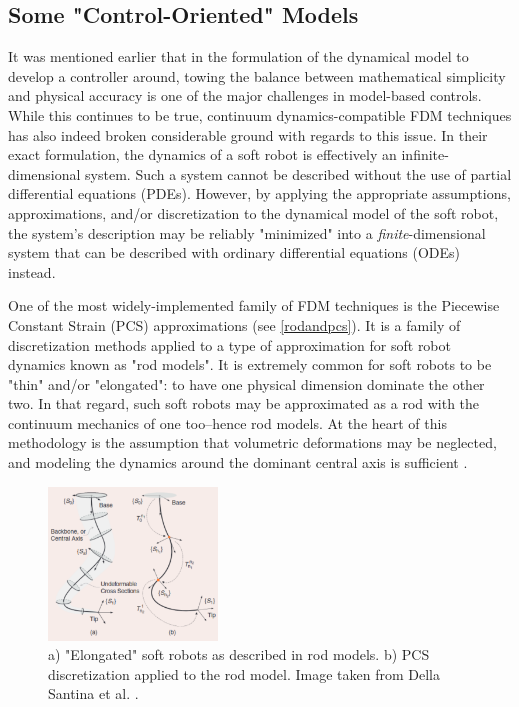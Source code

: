 \subsection{Some "Control-Oriented" Models}
It was mentioned earlier that in the formulation of the dynamical model to develop a controller around, towing the balance between mathematical simplicity and physical accuracy is one of the major challenges in model-based controls. While this continues to be true, continuum dynamics-compatible FDM techniques has also indeed broken considerable ground with regards to this issue. In their exact formulation, the dynamics of a soft robot is effectively an infinite-dimensional system. Such a system cannot be described without the use of partial differential equations (PDEs). However, by applying the appropriate assumptions, approximations, and/or discretization to the dynamical model of the soft robot, the system's description may be reliably "minimized" into a \textit{finite}-dimensional system that can be described with ordinary differential equations (ODEs) instead.

One of the most widely-implemented family of FDM techniques is the Piecewise Constant Strain (PCS) approximations (see \autoref{rodandpcs}). It is a family of discretization methods applied to a type of approximation for soft robot dynamics known as "rod models". It is extremely common for soft robots to be "thin" and/or "elongated": to have one physical dimension dominate the other two. In that regard, such soft robots may be approximated as a rod with the continuum mechanics of one too--hence rod models. At the heart of this methodology is the assumption that volumetric deformations may be neglected, and modeling the dynamics around the dominant central axis is sufficient \cite{della_santina_model-based_2023}.

\begin{figure}[h!]
    \centering
    \includegraphics[width=0.4\textwidth]{graphics/rodandpcs.png}
    \caption{a) "Elongated" soft robots as described in rod models. b) PCS discretization applied to the rod model. Image taken from Della Santina et al. \cite{della_santina_model-based_2023}.}
    \label{rodandpcs}
\end{figure}

